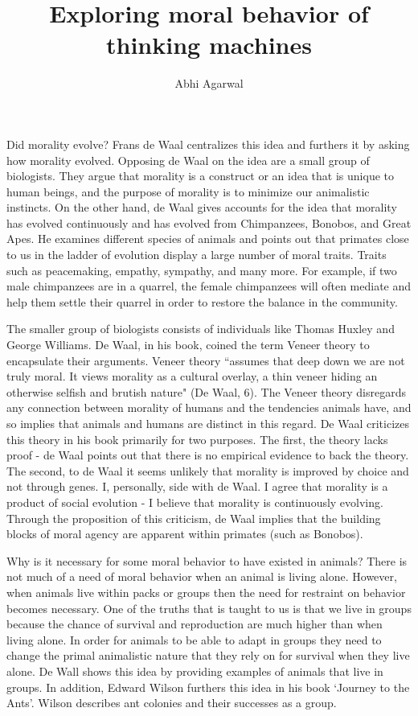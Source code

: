 \documentclass[11pt, oneside]{article}
\title{Exploring moral behavior of thinking machines}
\author{Abhi Agarwal}
\date{}
\begin{document}
\maketitle

\par Did morality evolve? Frans de Waal centralizes this idea and furthers it by asking how morality evolved. Opposing de Waal on the idea are a small group of biologists. They argue that morality is a construct or an idea that is unique to human beings, and the purpose of morality is to minimize our animalistic instincts. On the other hand, de Waal gives accounts for the idea that morality has evolved continuously and has evolved from Chimpanzees, Bonobos, and Great Apes. He examines different species of animals and points out that primates close to us in the ladder of evolution display a large number of moral traits. Traits such as peacemaking, empathy, sympathy, and many more. For example, if two male chimpanzees are in a quarrel, the female chimpanzees will often mediate and help them settle their quarrel in order to restore the balance in the community. 

\par The smaller group of biologists consists of individuals like Thomas Huxley and George Williams. De Waal, in his book, coined the term Veneer theory to encapsulate their arguments. Veneer theory ``assumes that deep down we are not truly moral. It views morality as a cultural overlay, a thin veneer hiding an otherwise selfish and brutish nature" (De Waal, 6). The Veneer theory disregards any connection between morality of humans and the tendencies animals have, and so implies that animals and humans are distinct in this regard. De Waal criticizes this theory in his book primarily for two purposes. The first, the theory lacks proof - de Waal points out that there is no empirical evidence to back the theory. The second, to de Waal it seems unlikely that morality is improved by choice and not through genes. I, personally, side with de Waal. I agree that morality is a product of social evolution - I believe that morality is continuously evolving. Through the proposition of this criticism, de Waal implies that the building blocks of moral agency are apparent within primates (such as Bonobos).

\par Why is it necessary for some moral behavior to have existed in animals? There is not much of a need of moral behavior when an animal is living alone. However, when animals live within packs or groups then the need for restraint on behavior becomes necessary. One of the truths that is taught to us is that we live in groups because the chance of survival and reproduction are much higher than when living alone. In order for animals to be able to adapt in groups they need to change the primal animalistic nature that they rely on for survival when they live alone. De Wall shows this idea by providing examples of animals that live in groups. In addition, Edward Wilson furthers this idea in his book `Journey to the Ants'. Wilson describes ant colonies and their successes as a group. 
\end{document}

